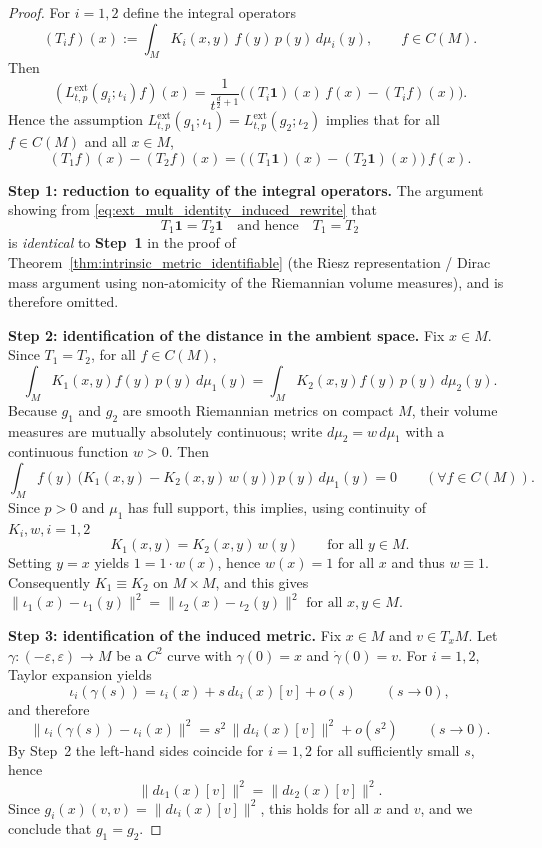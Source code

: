 \documentclass[10pt,a4paper]{amsart}
\begin{document}
\begin{proof}
For $i=1,2$ define the integral operators
\[
(T_i f)(x):=\int_M K_i(x,y)\,f(y)\,p(y)\,d\mu_i(y),
\qquad f\in C(M).
\]
Then
\[
(L^{\mathrm{ext}}_{t,p}(g_i;\iota_i)f)(x)
=\frac{1}{t^{\frac d2+1}}
\Big((T_i\mathbf 1)(x)\,f(x)-(T_i f)(x)\Big).
\]
Hence the assumption
$L^{\mathrm{ext}}_{t,p}(g_1;\iota_1)=L^{\mathrm{ext}}_{t,p}(g_2;\iota_2)$
implies that for all $f\in C(M)$ and all $x\in M$,
\begin{equation}
\label{eq:ext_mult_identity_induced_rewrite}
(T_1 f)(x)-(T_2 f)(x)
=\big((T_1\mathbf 1)(x)-(T_2\mathbf 1)(x)\big)\,f(x).
\end{equation}

\smallskip
\noindent\textbf{Step 1: reduction to equality of the integral operators.}
The argument showing from \eqref{eq:ext_mult_identity_induced_rewrite} that
\[
T_1\mathbf 1=T_2\mathbf 1
\quad\text{and hence}\quad
T_1=T_2
\]
is \emph{identical} to \textbf{Step~1} in the proof of
Theorem~\ref{thm:intrinsic_metric_identifiable}
(the Riesz representation / Dirac mass argument using non-atomicity of the
Riemannian volume measures), and is therefore omitted.

\smallskip
\noindent\textbf{Step 2: identification of the distance in the ambient space.}
Fix $x\in M$. Since $T_1=T_2$, for all $f\in C(M)$,
\[
\int_M K_1(x,y) f(y)\,p(y)\,d\mu_1(y)
=
\int_M K_2(x,y) f(y)\,p(y)\,d\mu_2(y).
\]
Because $g_1$ and $g_2$ are smooth Riemannian metrics on compact $M$,
their volume measures are mutually absolutely continuous; write
$d\mu_2=w\,d\mu_1$ with a continuous function $w>0$.
Then
\[
\int_M f(y)\,\bigl(K_1(x,y)-K_2(x,y)\,w(y)\bigr)\,p(y)\,d\mu_1(y)=0
\qquad(\forall f\in C(M)).
\]
Since $p>0$ and $\mu_1$ has full support, this implies, using continuity of $K_i, w, i=1,2$
\[
K_1(x,y)=K_2(x,y)\,w(y)\qquad\text{for all }y\in M.
\]
Setting $y=x$ yields $1=1\cdot w(x)$, hence $w(x)=1$ for all $x$ and thus
$w\equiv 1$. Consequently $K_1\equiv K_2$ on $M\times M$, and this gives 
\(
\|\iota_1(x)-\iota_1(y)\|^2
=\|\iota_2(x)-\iota_2(y)\|^2
\text{ for all }x,y\in M.
\)

\smallskip
\noindent\textbf{Step 3: identification of the induced metric.}
Fix $x\in M$ and $v\in T_xM$. Let $\gamma:(-\varepsilon,\varepsilon)\to M$
be a $C^2$ curve with $\gamma(0)=x$ and $\dot\gamma(0)=v$.
For $i=1,2$, Taylor expansion yields
\[
\iota_i(\gamma(s))
=\iota_i(x)+s\,d\iota_i(x)[v]+o(s)\qquad(s\to 0),
\]
and therefore
\[
\|\iota_i(\gamma(s))-\iota_i(x)\|^2
=s^2\,\|d\iota_i(x)[v]\|^2+o(s^2)\qquad(s\to 0).
\]
By Step~2 the left-hand sides coincide for $i=1,2$ for all sufficiently small
$s$, hence
\[
\|d\iota_1(x)[v]\|^2=\|d\iota_2(x)[v]\|^2.
\]
Since $g_i(x)(v,v)=\|d\iota_i(x)[v]\|^2$, this holds for all $x$ and $v$,
and we conclude that $g_1=g_2$.
\end{proof}
\end{document}
